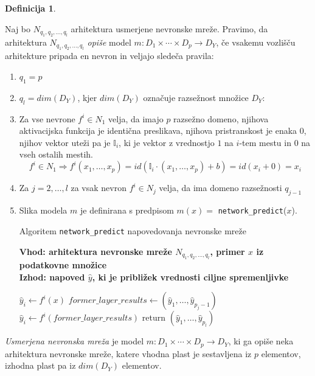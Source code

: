 \documentclass[12pt,a4paper,twoside]{article}
\theoremstyle{definition} %
\newtheorem{definicija}{Definicija}[section]
\theoremstyle{plain} %
\numberwithin{equation}{section}  %
\begin{document}
\begin{definicija}
\label{def:model-nn}
	
	Naj bo $N_{q_1,q_2,\ldots,q_l}$ arhitektura usmerjene nevronske mreže. 
	Pravimo, da arhitektura $N_{q_1,q_2,\ldots,q_l}$ \emph{opiše} model $m: D_1 \times \cdots \times D_p \rightarrow D_Y$, 
	če vsakemu vozlišču arhitekture pripada en nevron in veljajo sledeča pravila:

\begin{enumerate}
  \item $ q_1 = p$

  \item $q_l = dim(D_Y)$, kjer $dim(D_Y)$ označuje razsežnost množice $D_Y$:

  \item Za vse nevrone $f^i \in N_1$ velja, da imajo $p$ razsežno domeno, njihova aktivacijska funkcija je identična preslikava, 
  njihova pristranskost je enaka $0$, njihov vektor uteži pa je $\mathbb{I}_i$, ki je vektor z vrednostjo $1$ na $i$-tem mestu in $0$ na vseh ostalih mestih.
	\[
		f^i \in N_1 \Rightarrow f^i(x_1,\ldots,x_p) = id(\mathbb{I}_i \cdot (x_1,\ldots,x_p) + b) = id(x_i+0) = x_i
	\]

  \item Za $j=2,\ldots,l$ za vsak nevron $f^i \in N_j$ velja, da ima domeno razsežnosti $q_{j-1}$

  \item Slika modela $m$ je definirana s predpisom $m(x) =$ \texttt{network\_predict}($x$).

  \begin{algorithm}[ht]
    \caption{Algoritem \texttt{network\_predict} napovedovanja nevronske mreže}
    \label{algoritem-neural-predict}
    \raggedright
    \textbf{Vhod: arhitektura nevronske mreže $N_{q_1,q_2,\ldots,q_l}$, primer $x$ iz podatkovne množice}  \\
    \textbf{Izhod: napoved $\hat{y}$, ki je približek vrednosti ciljne spremenljivke} 
    \begin{algorithmic}[0]
		\State $\hat{y}_i \gets f^i(x)$
	\EndFor
		\State $\mathit{former\_layer\_results} \gets (\hat{y}_1,\ldots,\hat{y}_{p_j-1})$
			\State $\hat{y}_i \gets f^i(\mathit{former\_layer\_results})$
		\EndFor
	\EndFor
	\State return $(\hat{y}_1,\ldots,\hat{y}_{p_l})$
    \end{algorithmic}
  \end{algorithm}

\end{enumerate}

\emph{Usmerjena nevronska mreža} je model $m: D_1 \times \cdots \times D_p \rightarrow D_Y$, ki ga opiše neka arhitektura nevronske mreže, 
katere vhodna plast je sestavljena iz $p$ elementov, izhodna plast pa iz $dim(D_Y)$ elementov.
\end{definicija}
\end{document}
